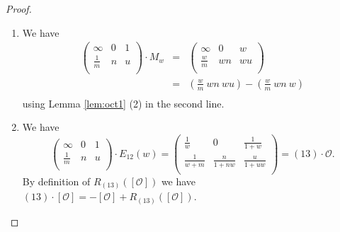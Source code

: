 \documentclass[12pt]{amsart}
\theoremstyle{definition}
\newcommand{\oct}{\mathcal{O}}%
\newcommand{\cyc}[1]{\left[ #1\right]} %
\newcommand{\<}{\langle}
\renewcommand{\>}{\rangle}
\begin{document}
\begin{proof}
\begin{enumerate}
\item We have 
\begin{eqnarray*}
\left(
\begin{array}{lll}
\infty&0&1\\
\frac{1}{m}&n&u\\
\end{array}
\right)\cdot M_w&=&
\left(
\begin{array}{lll}
\infty&0&w\\
\frac{w}{m}&wn&wu\\
\end{array}
\right)\\
&=& \left(\frac{w}{m}\ wn\ wu\right)-\left(\frac{w}{m}\ wn\ w\right)\\
\end{eqnarray*}
using Lemma \ref{lem:oct1} (2) in the second line.
\item We have
\[
\left(
\begin{array}{lll}
\infty&0&1\\
\frac{1}{m}&n&u\\
\end{array}
\right)
\cdot E_{12}(w)=
\left(
\begin{array}{lll}
\frac{1}{w}&0&\frac{1}{1+w}\\
\frac{1}{w+m}&\frac{n}{1+nw}&\frac{u}{1+uw}\\
\end{array}
\right)
=(1 3)\cdot \oct.
\]
By definition of $R_{(13)}(\cyc{\oct})$ we have $(13)\cdot \cyc{\oct} = -\cyc{\oct}+ R_{(13)}(\cyc{\oct})$.


\end{enumerate}
\end{proof}
\end{document}
